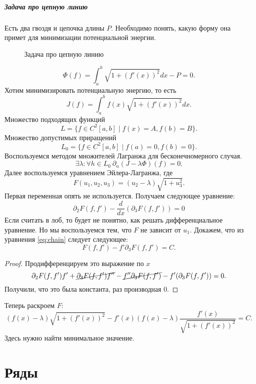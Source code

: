 \paragraph{Задача про цепную линию}
Есть два гвоздя и цепочка длины $ P$. Необходимо понять, какую форму она примет для минимизации потенциальной энергии.
\begin{figure}[ht]
    \centering
    \caption{Задача про цепную линию}
    \label{fig:chain-line}
\end{figure}
\[
    \Phi(f) =   \int_{a}^{b} \sqrt{ 1+ (f'(x))^2}  dx - P = 0
.\] 
Хотим минимизировать потенциальную энергию, то есть
\[
    J(f) = \int_{a}^{b} f(x) \sqrt{1 + (f'(x))^2 } dx 
.\] 
Множество подходящих функций
\[
    L = \{f \in C^2[a, b] \mid f(x) = A, f(b) = B\}
.\] 
Множество допустимых приращений
\[
	L_0 = \{f \in C^2[a, b] \mid f(a) = 0, f(b) = 0\}
.\] 
Воспользуемся методом множителей Лагранжа для бесконечномерного случая.
\[
	\exists \lambda\colon \forall h \in L_0 ~ \partial _n (J - \lambda \Phi )(f) = 0
.\]
Далее воспользуемся уравнением Эйлера-Лагранжа, где
\[
    F(u_1, u_2, u_3) = (u_2-\lambda)\sqrt{ 1+ u_3^2 } 
.\] 
Первая переменная опять не используется.
Получаем следующее уравнение:
\begin{equation}\label{eq:chain}
	\partial _2 F(f, f') -\frac{d}{dx}(\partial _3 F(f, f')) = 0
\end{equation}
Если считать в лоб, то будет не понятно, как решать дифференциальное уравнение. Но мы воспользуемся тем, что $ F$ не зависит от  $ u_1$.
Докажем, что из уравнения \ref{eq:chain} следует следующее:
\[
    F(f, f') - f' \partial _3F(f, f') = C
.\] 
\begin{proof}
Продифференцируем это выражение по $ x$
\[
    \partial _2 F(f, f')f' + \cancel{ \partial _3 F(f, f') f''} - \cancel{ f'' \partial _3 F(f, f')} - f'(\partial _3 F(f, f')) = 0
.\] 
Получили, что это была константа, раз производная 0.
\end{proof}
Теперь раскроем  $ F$:
\[
    (f(x) - \lambda) \sqrt{ 1 + (f'(x))^2}  - f'(x) (f(x) - \lambda) \frac{f'(x)}{\sqrt{1+(f'(x))^2 } } = C
.\] 
Здесь нужно найти минимальное значение.


\chapter{Ряды}
